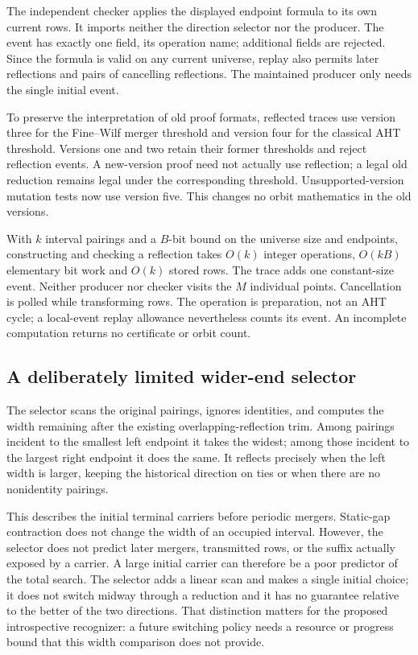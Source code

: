 The independent checker applies the displayed endpoint formula to its own
current rows. It imports neither the direction selector nor the producer.
The event has exactly one field, its operation name; additional fields
are rejected. Since the formula is valid on any current universe, replay
also permits later reflections and pairs of cancelling reflections.
The maintained producer only needs the single initial event.

To preserve the interpretation of old proof formats, reflected traces use
version three for the Fine--Wilf merger threshold and version four for
the classical AHT threshold. Versions one and two retain their former
thresholds and reject reflection events. A new-version proof need not
actually use reflection; a legal old reduction remains legal under the
corresponding threshold. Unsupported-version mutation tests now use
version five. This changes no orbit mathematics in the old versions.

With $k$ interval pairings and a $B$-bit bound on the universe size and endpoints,
constructing and
checking a reflection takes $O(k)$ integer operations, $O(kB)$ elementary
bit work and $O(k)$ stored rows. The trace adds one constant-size event.
Neither producer nor checker visits the $M$ individual points. Cancellation
is polled while transforming rows. The operation is preparation, not an
AHT cycle; a local-event replay allowance nevertheless counts its event.
An incomplete computation returns no certificate or orbit count.

\subsection{A deliberately limited wider-end selector}

The selector scans the original pairings, ignores identities, and computes
the width remaining after the existing overlapping-reflection trim. Among
pairings incident to the smallest left endpoint it takes the widest;
among those incident to the largest right endpoint it does the same.
It reflects precisely when the left width is larger, keeping the historical
direction on ties or when there are no nonidentity pairings.

This describes the initial terminal carriers before periodic mergers.
Static-gap contraction does not change the width of an occupied interval.
However, the selector does not predict later mergers, transmitted rows,
or the suffix actually exposed by a carrier. A large initial carrier can
therefore be a poor predictor of the total search. The selector adds a
linear scan and makes a single initial choice; it does not switch midway
through a reduction and it has no guarantee relative to the better of the
two directions. That distinction matters for the proposed introspective
recognizer: a future switching policy needs a resource or progress bound
that this width comparison does not provide.


